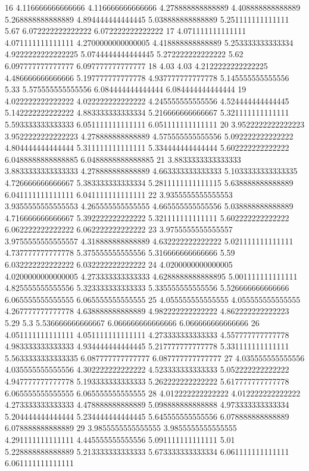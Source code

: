 16 4.116666666666666 4.116666666666666 4.278888888888889 4.408888888888889 5.268888888888889 4.894444444444445 5.038888888888889 5.251111111111111 5.67 6.072222222222222 6.072222222222222
17 4.071111111111111 4.071111111111111 4.2700000000000005 4.418888888888889 5.253333333333334 4.9222222222222225 5.0744444444444445 5.272222222222222 5.62 6.097777777777777 6.097777777777777
18 4.03 4.03 4.2122222222222225 4.486666666666666 5.197777777777778 4.937777777777778 5.145555555555556 5.33 5.575555555555556 6.084444444444444 6.084444444444444
19 4.022222222222222 4.022222222222222 4.245555555555556 4.524444444444445 5.142222222222222 4.883333333333334 5.216666666666667 5.321111111111111 5.593333333333333 6.051111111111111 6.051111111111111
20 3.9522222222222223 3.9522222222222223 4.278888888888889 4.575555555555556 5.092222222222222 4.804444444444444 5.311111111111111 5.334444444444444 5.602222222222222 6.0488888888888885 6.0488888888888885
21 3.8833333333333333 3.8833333333333333 4.278888888888889 4.663333333333333 5.1033333333333335 4.726666666666667 5.383333333333334 5.2811111111111115 5.638888888888889 6.041111111111111 6.041111111111111
22 3.9355555555555553 3.9355555555555553 4.265555555555555 4.665555555555556 5.038888888888889 4.716666666666667 5.392222222222222 5.321111111111111 5.602222222222222 6.062222222222222 6.062222222222222
23 3.9755555555555557 3.9755555555555557 4.318888888888889 4.632222222222222 5.021111111111111 4.737777777777778 5.375555555555556 5.316666666666666 5.59 6.032222222222222 6.032222222222222
24 4.0200000000000005 4.0200000000000005 4.273333333333333 4.6288888888888895 5.001111111111111 4.825555555555556 5.323333333333333 5.335555555555556 5.526666666666666 6.065555555555555 6.065555555555555
25 4.055555555555555 4.055555555555555 4.267777777777778 4.638888888888889 4.982222222222222 4.862222222222223 5.29 5.3 5.536666666666667 6.066666666666666 6.066666666666666
26 4.051111111111111 4.051111111111111 4.273333333333333 4.557777777777778 4.983333333333333 4.934444444444445 5.217777777777778 5.331111111111111 5.5633333333333335 6.087777777777777 6.087777777777777
27 4.035555555555556 4.035555555555556 4.302222222222222 4.523333333333333 5.052222222222222 4.947777777777778 5.193333333333333 5.262222222222222 5.617777777777778 6.065555555555555 6.065555555555555
28 4.012222222222222 4.012222222222222 4.273333333333333 4.478888888888889 5.098888888888888 4.973333333333334 5.204444444444444 5.234444444444445 5.645555555555556 6.078888888888889 6.078888888888889
29 3.9855555555555555 3.9855555555555555 4.291111111111111 4.445555555555556 5.091111111111111 5.01 5.228888888888889 5.213333333333333 5.673333333333334 6.061111111111111 6.061111111111111
